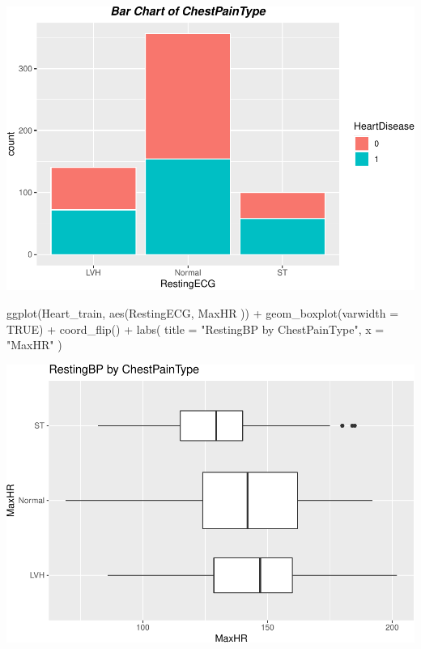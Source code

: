 \documentclass[
]{article}
\newenvironment{Shaded}{\begin{snugshade}}{\end{snugshade}}
\newcommand{\AttributeTok}[1]{\textcolor[rgb]{0.77,0.63,0.00}{#1}}
\newcommand{\ConstantTok}[1]{\textcolor[rgb]{0.00,0.00,0.00}{#1}}
\newcommand{\FunctionTok}[1]{\textcolor[rgb]{0.00,0.00,0.00}{#1}}
\newcommand{\NormalTok}[1]{#1}
\newcommand{\SpecialCharTok}[1]{\textcolor[rgb]{0.00,0.00,0.00}{#1}}
\newcommand{\StringTok}[1]{\textcolor[rgb]{0.31,0.60,0.02}{#1}}
\begin{document}
\includegraphics{PSTAT-131--FINAL-PROJECT-_YIFAN-XU_files/figure-latex/unnamed-chunk-13-1.pdf}

\begin{Shaded}
\begin{Highlighting}[]
\FunctionTok{ggplot}\NormalTok{(Heart\_train, }\FunctionTok{aes}\NormalTok{(RestingECG, MaxHR )) }\SpecialCharTok{+}
  \FunctionTok{geom\_boxplot}\NormalTok{(}\AttributeTok{varwidth =} \ConstantTok{TRUE}\NormalTok{) }\SpecialCharTok{+} 
  \FunctionTok{coord\_flip}\NormalTok{() }\SpecialCharTok{+}
  \FunctionTok{labs}\NormalTok{(}
    \AttributeTok{title =} \StringTok{"RestingBP by ChestPainType"}\NormalTok{,}
    \AttributeTok{x =} \StringTok{"MaxHR"}
\NormalTok{  )}
\end{Highlighting}
\end{Shaded}

\includegraphics{PSTAT-131--FINAL-PROJECT-_YIFAN-XU_files/figure-latex/unnamed-chunk-14-1.pdf}
\end{document}
